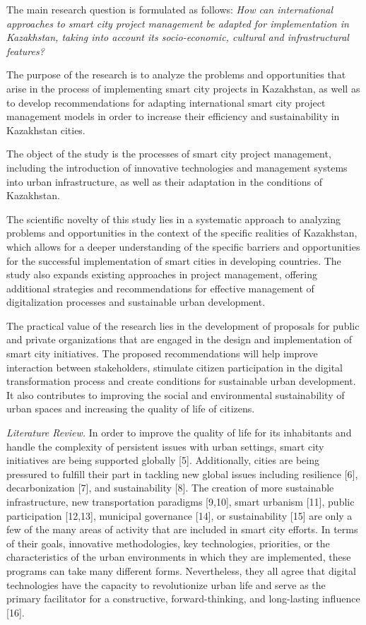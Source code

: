 {The main research question is formulated as follows: \emph{How can
international approaches to smart city project management be adapted for
implementation in Kazakhstan, taking into account its socio-economic,
cultural and infrastructural features?}

The purpose of the research is to analyze the problems and opportunities
that arise in the process of implementing smart city projects in
Kazakhstan, as well as to develop recommendations for adapting
international smart city project management models in order to increase
their efficiency and sustainability in Kazakhstan cities.

The object of the study is the processes of smart city project
management, including the introduction of innovative technologies and
management systems into urban infrastructure, as well as their
adaptation in the conditions of Kazakhstan.

The scientific novelty of this study lies in a systematic approach to
analyzing problems and opportunities in the context of the specific
realities of Kazakhstan, which allows for a deeper understanding of the
specific barriers and opportunities for the successful implementation of
smart cities in developing countries. The study also expands existing
approaches in project management, offering additional strategies and
recommendations for effective management of digitalization processes and
sustainable urban development.

The practical value of the research lies in the development of proposals
for public and private organizations that are engaged in the design and
implementation of smart city initiatives. The proposed recommendations
will help improve interaction between stakeholders, stimulate citizen
participation in the digital transformation process and create
conditions for sustainable urban development. It also contributes to
improving the social and environmental sustainability of urban spaces
and increasing the quality of life of citizens.

\emph{Literature Review.} In order to improve the quality of life for
its inhabitants and handle the complexity of persistent issues with
urban settings, smart city initiatives are being supported globally
{[}5{]}. Additionally, cities are being pressured to fulfill their part
in tackling new global issues including resilience {[}6{]},
decarbonization {[}7{]}, and sustainability {[}8{]}. The creation of
more sustainable infrastructure, new transportation paradigms
{[}9,10{]}, smart urbanism {[}11{]}, public participation {[}12,13{]},
municipal governance {[}14{]}, or sustainability {[}15{]} are only a few
of the many areas of activity that are included in smart city efforts.
In terms of their goals, innovative methodologies, key technologies,
priorities, or the characteristics of the urban environments in which
they are implemented, these programs can take many different forms.
Nevertheless, they all agree that digital technologies have the capacity
to revolutionize urban life and serve as the primary facilitator for a
constructive, forward-thinking, and long-lasting influence {[}16{]}.

}

